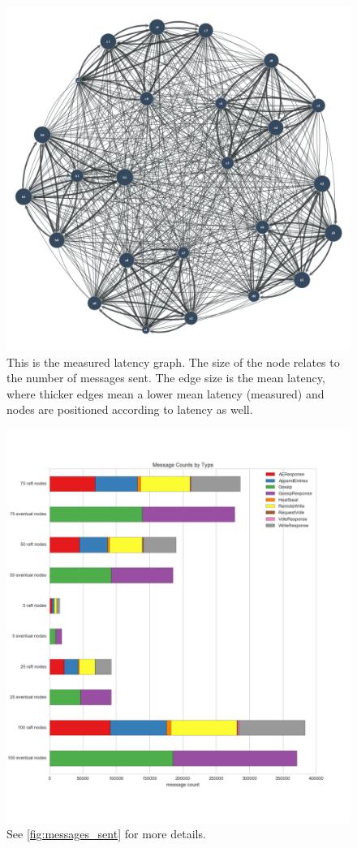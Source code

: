 \documentclass[11pt,letterpaper]{article}
\begin{document}
\begin{figure}[!h]
    \centering
        \includegraphics[width=\textwidth]{figures/eventual-25nodes.png}
        \caption{\textsf{This is the measured latency graph. The size of the node relates to the number of messages sent. The edge size is the mean latency, where thicker edges mean a lower mean latency (measured) and nodes are positioned according to latency as well.}}
        \label{fig:topology}
\end{figure}

\begin{figure}[!h]
    \centering
        \includegraphics[height=.9\textheight]{figures/message_counts.png}
        \caption{\textsf{See \ref{fig:messages_sent} for more details.}}
        \label{fig:message_counts}
\end{figure}
\end{document}
